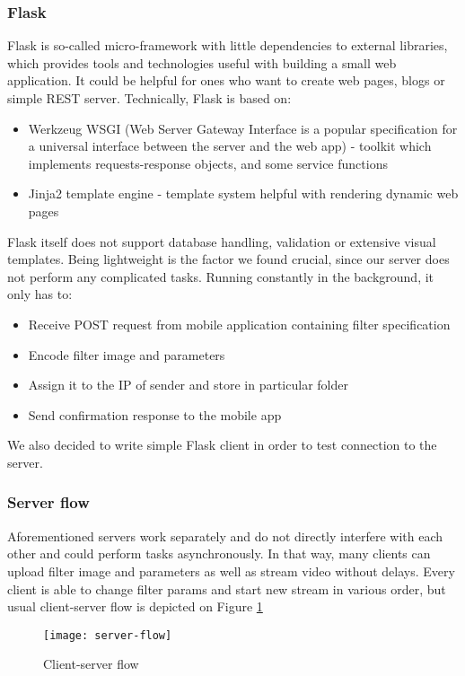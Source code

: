 \documentclass[../Main.tex]{subfiles}
\begin{document}
    \subsubsection{Flask}
    Flask is so-called micro-framework with little dependencies to external libraries, which provides tools and technologies useful with building a small web application. It could be helpful for ones who want to create web pages, blogs or simple REST server. 
    Technically, Flask is based on:
    \begin{itemize}
    \item Werkzeug WSGI (Web Server Gateway Interface is a popular specification for a universal interface between the  server and the web app) - toolkit which implements requests-response objects, and some service functions
    \item Jinja2 template engine - template system helpful with rendering dynamic web pages
    \end{itemize}
    Flask itself does not support database handling, validation or extensive visual templates. Being lightweight is the factor we found crucial, since our server does not perform any complicated tasks. Running constantly in the background, it only has to:
    \begin{itemize}
    \item Receive POST request from mobile application containing filter specification 
    \item Encode filter image and parameters
    \item Assign it to the IP of sender and store in particular folder
    \item Send confirmation response to the mobile app
    \end{itemize}
    We also decided to write simple Flask client in order to test connection to the server.
    
    \subsubsection{Server flow}
    Aforementioned servers work separately and do not directly interfere with each other and could perform tasks asynchronously. In that way, many clients can upload filter image and parameters as well as stream video without delays. Every client is able to change filter params and start new stream in various order, but usual client-server flow is depicted on Figure \ref{fig:server-flow} \\
    \begin{figure}[h]
    \centering
    \texttt{[image: server-flow]}
    \caption{Client-server flow}
        \label{fig:server-flow}
    \end{figure}
    
\end{document}
